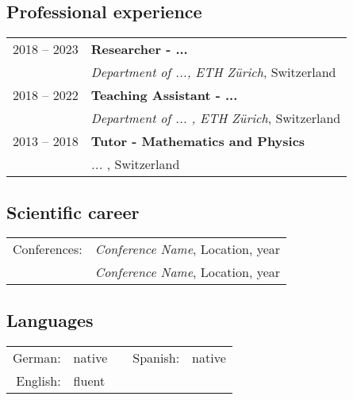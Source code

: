 \subsection*{Professional experience}
\begin{tabular}{ll}
	
	2018 -- 2023 &\textbf{Researcher - ... }\\
                 &\textit{Department of ..., ETH Z\"urich}, Switzerland\\
	
	2018 -- 2022 &\textbf{Teaching Assistant - ...}\\
                 &\textit{Department of ... , ETH Z\"urich}, Switzerland\\
	
	2013 -- 2018 &\textbf{Tutor - Mathematics and Physics}\\
                 &\textit{ ... }, Switzerland\\
	
	
	

	
\end{tabular}

\subsection*{Scientific career}
\begin{tabular}{ll}
	
  Conferences: &\textit{Conference Name}, Location, year \\
               &\textit{Conference Name}, Location, year \\
               
\end{tabular}

\subsection*{Languages}
\begin{tabular}{rlcrl}
	
	German:&native&&Spanish:&native\\
	English:&fluent&&&\\
	
\end{tabular}



